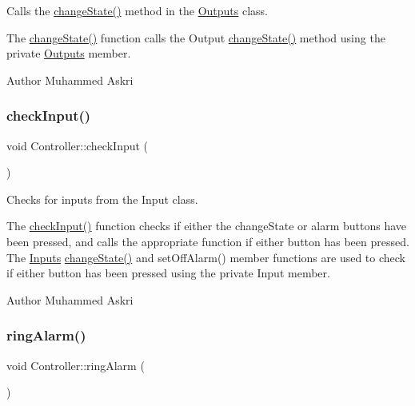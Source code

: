 Calls the \hyperlink{classController_a783956d7ffd422c814c8d62926c38f5c}{change\+State()} method in the \hyperlink{classOutputs}{Outputs} class. 

The \hyperlink{classController_a783956d7ffd422c814c8d62926c38f5c}{change\+State()} function calls the Output \hyperlink{classController_a783956d7ffd422c814c8d62926c38f5c}{change\+State()} method using the private \hyperlink{classOutputs}{Outputs} member.

\begin{DoxyAuthor}{Author}
Muhammed Askri 
\end{DoxyAuthor}
\mbox{\label{classController_aa11154b00ad33bb5a54f4e66bd279f23}} 
\subsubsection{\texorpdfstring{check\+Input()}{checkInput()}}
{\footnotesize\ttfamily void Controller\+::check\+Input (\begin{DoxyParamCaption}{ }\end{DoxyParamCaption})}



Checks for inputs from the Input class. 

The \hyperlink{classController_aa11154b00ad33bb5a54f4e66bd279f23}{check\+Input()} function checks if either the change\+State or alarm buttons have been pressed, and calls the appropriate function if either button has been pressed. The \hyperlink{classInputs}{Inputs} \hyperlink{classController_a783956d7ffd422c814c8d62926c38f5c}{change\+State()} and set\+Off\+Alarm() member functions are used to check if either button has been pressed using the private Input member.

\begin{DoxyAuthor}{Author}
Muhammed Askri 
\end{DoxyAuthor}
\mbox{\label{classController_a051818aaff4b6e373881e1878faeaca7}} 
\subsubsection{\texorpdfstring{ring\+Alarm()}{ringAlarm()}}
{\footnotesize\ttfamily void Controller\+::ring\+Alarm (\begin{DoxyParamCaption}{ }\end{DoxyParamCaption})\hspace{0.3cm}{\ttfamily [private]}}



